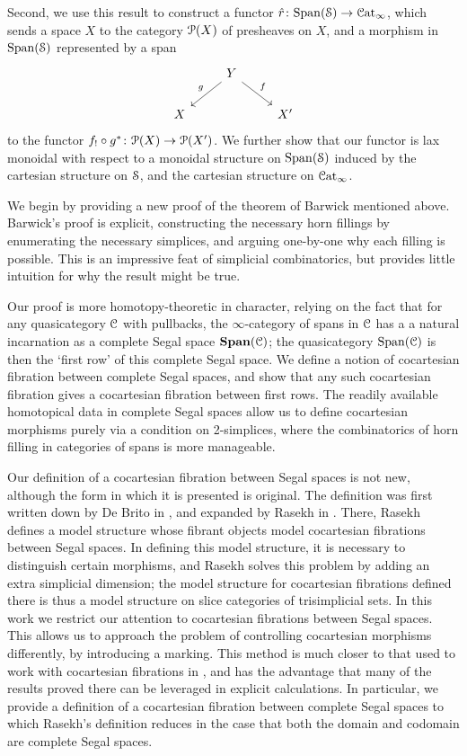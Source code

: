 \documentclass[main.tex]{subfiles}
\begin{document}
Second, we use this result to construct a functor $\hat{r}\colon \Span(\category{S}) \to \ICat$, which sends a space $X$ to the category $\P(X)$ of presheaves on $X$, and a morphism in $\Span(\S)$ represented by a span
\begin{equation*}
  \begin{tikzcd}
    & Y
    \arrow[dl, swap, "g"]
    \arrow[dr, "f"]
    \\
    X
    && X'
  \end{tikzcd}
\end{equation*}
to the functor $f_{!} \circ g^{*}\colon \P(X) \to \P(X')$. We further show that our functor is lax monoidal with respect to a monoidal structure on $\Span(\S)$ induced by the cartesian structure on $\S$, and the cartesian structure on $\ICat$.

We begin by providing a new proof of the theorem of Barwick mentioned above. Barwick's proof is explicit, constructing the necessary horn fillings by enumerating the necessary simplices, and arguing one-by-one why each filling is possible. This is an impressive feat of simplicial combinatorics, but provides little intuition for why the result might be true.

Our proof is more homotopy-theoretic in character, relying on the fact that for any quasicategory $\category{C}$ with pullbacks, the $\infty$-category of spans in $\category{C}$ has a a natural incarnation as a complete Segal space $\SPAN(\category{C})$; the quasicategory $\Span(\category{C})$ is then the `first row' of this complete Segal space. We define a notion of cocartesian fibration between complete Segal spaces, and show that any such cocartesian fibration gives a cocartesian fibration between first rows. The readily available homotopical data in complete Segal spaces allow us to define cocartesian morphisms purely via a condition on 2-simplices, where the combinatorics of horn filling in categories of spans is more manageable.

Our definition of a cocartesian fibration between Segal spaces is not new, although the form in which it is presented is original. The definition was first written down by De Brito in \cite{2016arXiv160500706B}, and expanded by Rasekh in \cite{rasekhcartesianfibrations}. There, Rasekh defines a model structure whose fibrant objects model cocartesian fibrations between Segal spaces. In defining this model structure, it is necessary to distinguish certain morphisms, and Rasekh solves this problem by adding an extra simplicial dimension; the model structure for cocartesian fibrations defined there is thus a model structure on slice categories of trisimplicial sets. In this work we restrict our attention to cocartesian fibrations between Segal spaces. This allows us to approach the problem of controlling cocartesian morphisms differently, by introducing a marking. This method is much closer to that used to work with cocartesian fibrations in \cite{highertopostheory}, and has the advantage that many of the results proved there can be leveraged in explicit calculations. In particular, we provide a definition of a cocartesian fibration between complete Segal spaces to which Rasekh's definition reduces in the case that both the domain and codomain are complete Segal spaces.
\end{document}
